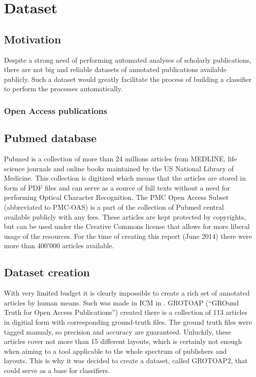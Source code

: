 \chapter{Dataset}
\section{Motivation}
Despite a strong need of performing automated analyses of scholarly publications, there are not big and reliable datasets of annotated publications available publicly. Such a dataset would greatly facilitate the process of building a classifier to perform the processes automatically.
\subsection{Open Access publications}
\section{Pubmed database}
Pubmed \cite{Pubmed} is a collection of more than 24 millions articles from MEDLINE, life science journals and online books maintained by the US National Library of Medicine. This collection is digitized which means that the articles are stored in form of PDF files and can serve as a source of full texts without a need for performing Optical Character Recognition. 
The PMC Open Access Subset (abbreviated to PMC-OAS) is a part of the collection of Pubmed central available publicly with any fees. These articles are kept protected by copyrights, but can be used under the Creative Commons license that allows for more liberal usage of the resources. For the time of creating this report (June 2014) there were more than 400'000 articles available.
\section{Dataset creation}
With very limited budget it is clearly impossible to create a rich set of annotated articles by human means. Such was made in ICM in \cite{DominikaTkaczykArturCzeczkoKrzysztofRusekLukaszBolikowski2012}. GROTOAP (``GROund Truth for Open Access Publications'') created there is a collection of 113 articles in digitial form with corresponding ground-truth files. The ground truth files were tagged manualy, so precision and accuracy are guaranteed. Unluckily, these articles cover not more than 15 different layouts, which is certainly not enough when aiming to a tool applicable to the whole spectrum of publishers and layouts. This is why it was decided to create a dataset, called GROTOAP2, that could serve as a base for classifiers.
